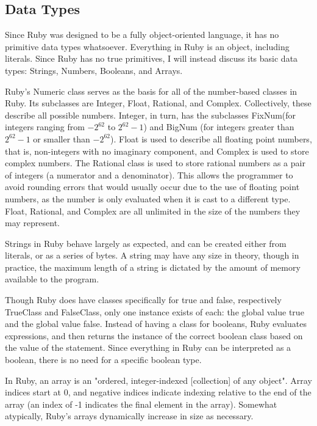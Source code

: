 \documentclass[12pt]{article}
\begin{document}
\subsection{Data Types}
Since Ruby was designed to be a fully object-oriented language, it has no primitive data types whatsoever. Everything in Ruby is an object, including literals. Since Ruby has no true primitives, I will instead discuss its basic data types: Strings, Numbers, Booleans, and Arrays.

Ruby's Numeric class serves as the basis for all of the number-based classes in Ruby. Its subclasses are Integer, Float, Rational, and Complex. Collectively, these describe all possible numbers. Integer, in turn, has the subclasses FixNum(for integers ranging from $-2^{62}$ to $2^{62} - 1$) and BigNum (for integers greater than $2^{62}-1$ or smaller than $-2^{62}$). Float is used to describe all floating point numbers, that is, non-integers with no imaginary component, and Complex is used to store complex numbers. The Rational class is used to store rational numbers as a pair of integers (a numerator and a denominator). This allows the programmer to avoid rounding errors that would usually occur due to the use of floating point numbers, as the number is only evaluated when it is cast to a different type. Float, Rational, and Complex are all unlimited in the size of the numbers they may represent\cite{rubydocs}.

Strings in Ruby behave largely as expected, and can be created either from literals, or as a series of bytes. A string may have any size in theory, though in practice, the maximum length of a string is dictated by the amount of memory available to the program.

Though Ruby does have classes specifically for true and false, respectively TrueClass and FalseClass, only one instance exists of each: the global value true and the global value false. Instead of having a class for booleans, Ruby evaluates expressions, and then returns the instance of the correct boolean class based on the value of the statement. Since everything in Ruby can be interpreted as a boolean, there is no need for a specific boolean type\cite{forumbool}.

In Ruby, an array is an "ordered, integer-indexed [collection] of any object"\cite{docsarray}. Array indices start at 0, and negative indices indicate indexing relative to the end of the array (an index of -1 indicates the final element in the array). Somewhat atypically, Ruby's arrays dynamically increase in size as necessary\cite{docsarray}.
\end{document}
